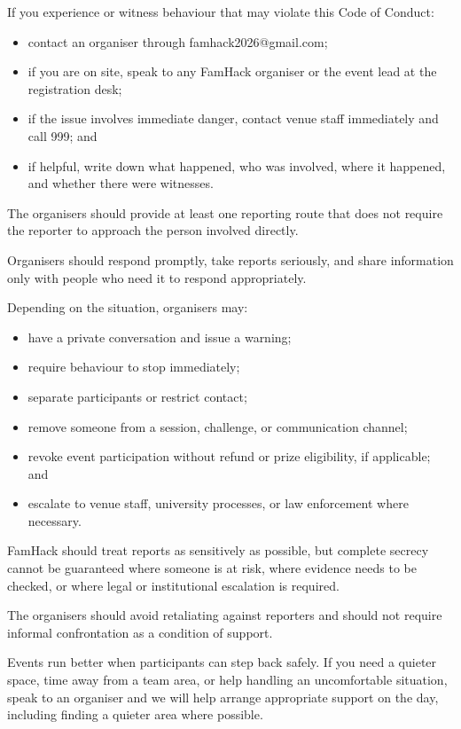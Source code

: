 \documentclass[11pt]{article}
\begin{document}
If you experience or witness behaviour that may violate this Code of Conduct:
\begin{itemize}
  \item contact an organiser through famhack2026@gmail.com;
  \item if you are on site, speak to any FamHack organiser or the event lead at the registration desk;
  \item if the issue involves immediate danger, contact venue staff immediately and call 999; and
  \item if helpful, write down what happened, who was involved, where it happened, and whether there were witnesses.
\end{itemize}

The organisers should provide at least one reporting route that does not require the reporter to approach the person involved directly.

Organisers should respond promptly, take reports seriously, and share information only with people who need it to respond appropriately.

Depending on the situation, organisers may:
\begin{itemize}
  \item have a private conversation and issue a warning;
  \item require behaviour to stop immediately;
  \item separate participants or restrict contact;
  \item remove someone from a session, challenge, or communication channel;
  \item revoke event participation without refund or prize eligibility, if applicable; and
  \item escalate to venue staff, university processes, or law enforcement where necessary.
\end{itemize}

FamHack should treat reports as sensitively as possible, but complete secrecy cannot be guaranteed where someone is at risk, where evidence needs to be checked, or where legal or institutional escalation is required.

The organisers should avoid retaliating against reporters and should not require informal confrontation as a condition of support.

Events run better when participants can step back safely. If you need a quieter space, time away from a team area, or help handling an uncomfortable situation, speak to an organiser and we will help arrange appropriate support on the day, including finding a quieter area where possible.
\end{document}
